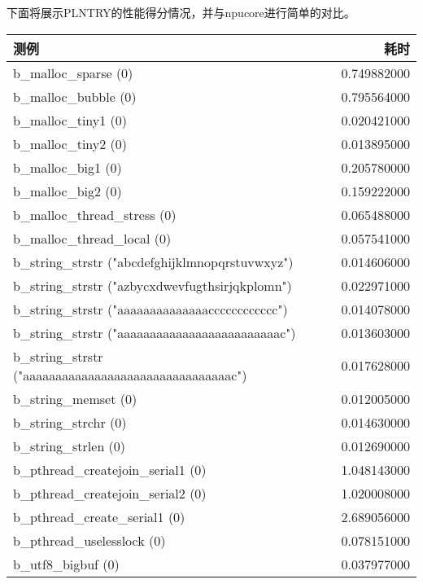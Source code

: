 下面将展示PLNTRY的性能得分情况，并与npucore进行简单的对比。

\begin{table}[H]
    \centering
    \begin{tabular}{|l|r|}
        \hline
        测例 & 耗时 \\
        \hline
        b\_malloc\_sparse (0) & 0.749882000 \\
        \hline
        b\_malloc\_bubble (0) & 0.795564000 \\
        \hline
        b\_malloc\_tiny1 (0) & 0.020421000 \\
        \hline
        b\_malloc\_tiny2 (0) & 0.013895000 \\
        \hline
        b\_malloc\_big1 (0) & 0.205780000 \\
        \hline
        b\_malloc\_big2 (0) & 0.159222000 \\
        \hline
        b\_malloc\_thread\_stress (0) & 0.065488000 \\
        \hline
        b\_malloc\_thread\_local (0) & 0.057541000 \\
        \hline
        b\_string\_strstr ("abcdefghijklmnopqrstuvwxyz") & 0.014606000 \\
        \hline
        b\_string\_strstr ("azbycxdwevfugthsirjqkplomn") & 0.022971000 \\
        \hline
        b\_string\_strstr ("aaaaaaaaaaaaaacccccccccccc") & 0.014078000 \\
        \hline
        b\_string\_strstr ("aaaaaaaaaaaaaaaaaaaaaaaaac") & 0.013603000 \\
        \hline
        b\_string\_strstr ("aaaaaaaaaaaaaaaaaaaaaaaaaaaaaaaac") & 0.017628000 \\
        \hline
        b\_string\_memset (0) & 0.012005000 \\
        \hline
        b\_string\_strchr (0) & 0.014630000 \\
        \hline
        b\_string\_strlen (0) & 0.012690000 \\
        \hline
        b\_pthread\_createjoin\_serial1 (0) & 1.048143000 \\
        \hline
        b\_pthread\_createjoin\_serial2 (0) & 1.020008000 \\
        \hline
        b\_pthread\_create\_serial1 (0) & 2.689056000 \\
        \hline
        b\_pthread\_uselesslock (0) & 0.078151000 \\
        \hline
        b\_utf8\_bigbuf (0) & 0.037977000 \\

\end{tabular}
\end{table}
